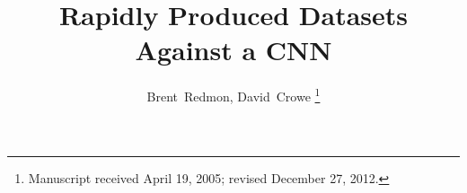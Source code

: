 \documentclass[12pt,journal,compsoc]{IEEEtran}
\begin{document}
%
\title{Rapidly Produced Datasets Against a CNN}
%
%
%
%

\author{Brent~Redmon,
        David~Crowe%
\thanks{Manuscript received April 19, 2005; revised December 27, 2012.}}

% 
%
\end{document}
